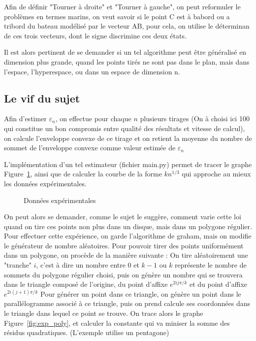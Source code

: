 \documentclass[a4paper,12pt,twoside]{article}
\begin{document}
		Afin de définir "Tourner à droite" et "Tourner à gauche", on peut reformuler le problèmes en termes marins, on veut savoir si le point C est à babord ou a tribord du bateau modélisé par le vecteur AB, pour cela, on utilise le déterminan de ces trois vecteurs, dont le signe discrimine ces deux états.

		Il est alors pertinent de se demander si un tel algorithme peut être généralisé en dimension plus grande, quand les points tirés ne sont pas dans le plan, mais dans l'espace, l'hyperespace, ou dans un espace de dimension n.



	\subsection{Le vif du sujet}
		Afin d'estimer $\varepsilon_n$, on effectue pour chaque $n$ plusieurs tirages (On à choisi ici 100 qui constitue un bon compromis entre qualité des résultats et vitesse de calcul), on calcule l'enveloppe convexe de ce tirage et on retient la moyenne du nombre de sommet de l'enveloppe convexe comme valeur estimée de $\varepsilon_n$

		L'implémentation d'un tel estimateur (fichier main.py) permet de tracer le graphe Figure~\ref{fig:exp_cercle}, ainsi que de calculer la courbe de la forme $kn^{1/3}$ qui approche au mieux les données expérimentales.

		\begin{figure}[htpb]
			\centering
			
			\caption{Données expérimentales}
			\label{fig:exp_cercle}
		\end{figure}

		On peut alors se demander, comme le sujet le suggère, comment varie cette loi quand on tire ces points non plus dans un disque, mais dans un polygone régulier.
		Pour effectuer cette expérience, on garde l'algorithme de graham, mais on modifie le générateur de nombre aléatoires. Pour pouvoir tirer des points uniformément dans un polygone, on procède de la manière suivante : On tire aléatoirement une "tranche" $i$, c'est à dire un nombre entre $0$ et $k-1$ ou $k$ représente le nombre de sommets du polygone régulier choisi, puis on génère un nombre qui se trouvera dans le triangle composé de l'origine, du point d'affixe $e^{2ij\pi/k}$ et du point d'affixe $e^{2i(j+1)\pi/k}$
		Pour générer un point dans ce triangle, on génère un point dans le parallélogramme associé à ce triangle, puis on prend calcule ses coordonnées dans le triangle dans lequel ce point se trouve. 
		On trace alors le graphe Figure~\ref{fig:exp_poly}, et calculer la constante qui va miniser la somme des résidus quadratiques. (L'exemple utilise un pentagone)
\end{document}
